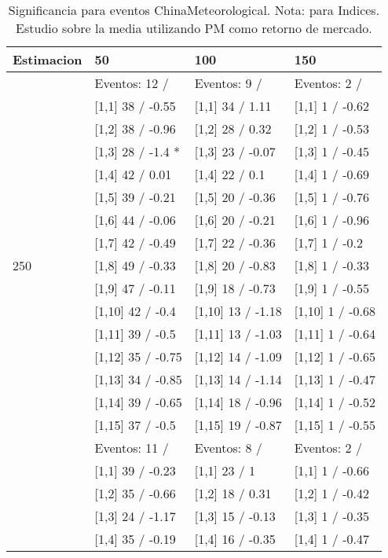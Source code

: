 \begin{table}

\caption{Significancia para eventos ChinaMeteorological. Nota: para Indices. Estudio sobre la media utilizando PM como retorno de mercado.}
\centering
\begin{tabular}[t]{llll}
\toprule
Estimacion & 50 & 100 & 150\\
\midrule
 & Eventos:  12 / & Eventos:  9 / & Eventos:  2 /\\
 & {}[1,1] 38  / -0.55 & {}[1,1] 34  / 1.11 & {}[1,1] 1  / -0.62\\
 & {}[1,2] 38  / -0.96 & {}[1,2] 28  / 0.32 & {}[1,2] 1  / -0.53\\
 & {}[1,3] 28  / -1.4 * & {}[1,3] 23  / -0.07 & {}[1,3] 1  / -0.45\\
 & {}[1,4] 42  / 0.01 & {}[1,4] 22  / 0.1 & {}[1,4] 1  / -0.69\\
\addlinespace
 & {}[1,5] 39  / -0.21 & {}[1,5] 20  / -0.36 & {}[1,5] 1  / -0.76\\
 & {}[1,6] 44  / -0.06 & {}[1,6] 20  / -0.21 & {}[1,6] 1  / -0.96\\
 & {}[1,7] 42  / -0.49 & {}[1,7] 22  / -0.36 & {}[1,7] 1  / -0.2\\
250 & {}[1,8] 49  / -0.33 & {}[1,8] 20  / -0.83 & {}[1,8] 1  / -0.33\\
 & {}[1,9] 47  / -0.11 & {}[1,9] 18  / -0.73 & {}[1,9] 1  / -0.55\\
\addlinespace
 & {}[1,10] 42  / -0.4 & {}[1,10] 13  / -1.18 & {}[1,10] 1  / -0.68\\
 & {}[1,11] 39  / -0.5 & {}[1,11] 13  / -1.03 & {}[1,11] 1  / -0.64\\
 & {}[1,12] 35  / -0.75 & {}[1,12] 14  / -1.09 & {}[1,12] 1  / -0.65\\
 & {}[1,13] 34  / -0.85 & {}[1,13] 14  / -1.14 & {}[1,13] 1  / -0.47\\
 & {}[1,14] 39  / -0.65 & {}[1,14] 18  / -0.96 & {}[1,14] 1  / -0.52\\
\addlinespace
 & {}[1,15] 37  / -0.5 & {}[1,15] 19  / -0.87 & {}[1,15] 1  / -0.55\\
 & Eventos:  11 / & Eventos:  8 / & Eventos:  2 /\\
 & {}[1,1] 39  / -0.23 & {}[1,1] 23  / 1 & {}[1,1] 1  / -0.66\\
 & {}[1,2] 35  / -0.66 & {}[1,2] 18  / 0.31 & {}[1,2] 1  / -0.42\\
 & {}[1,3] 24  / -1.17 & {}[1,3] 15  / -0.13 & {}[1,3] 1  / -0.35\\
\addlinespace
 & {}[1,4] 35  / -0.19 & {}[1,4] 16  / -0.35 & {}[1,4] 1  / -0.47\\

\end{tabular}
\end{table}
